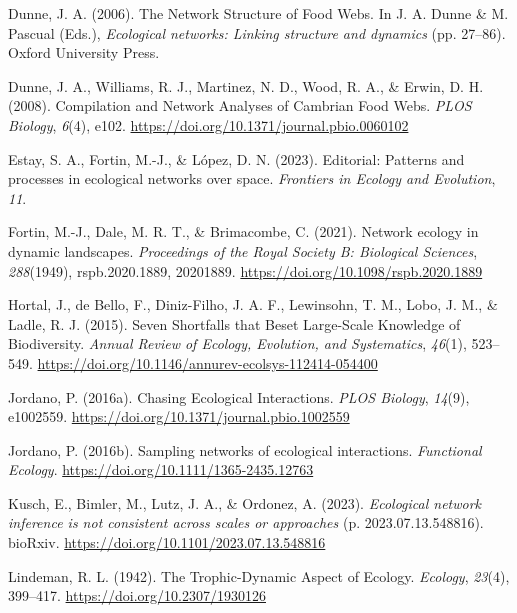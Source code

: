 \documentclass[
]{article}
\newlength{\cslhangindent}
\newenvironment{CSLReferences}[2] %
 {\begin{list}{}{%
  \setlength{\itemindent}{0pt}
  \setlength{\leftmargin}{0pt}
  \setlength{\parsep}{0pt}
  \ifodd #1
   \setlength{\leftmargin}{\cslhangindent}
   \setlength{\itemindent}{-1\cslhangindent}
  \fi
  \setlength{\itemsep}{#2\baselineskip}}}
 {\end{list}}
\begin{document}
\begin{CSLReferences}{1}{0}
Dunne, J. A. (2006). The {Network Structure} of {Food Webs}. In J. A.
Dunne \& M. Pascual (Eds.), \emph{Ecological networks: {Linking}
structure and dynamics} (pp. 27--86). Oxford University Press.

Dunne, J. A., Williams, R. J., Martinez, N. D., Wood, R. A., \& Erwin,
D. H. (2008). Compilation and {Network Analyses} of {Cambrian Food
Webs}. \emph{PLOS Biology}, \emph{6}(4), e102.
\url{https://doi.org/10.1371/journal.pbio.0060102}

Estay, S. A., Fortin, M.-J., \& López, D. N. (2023). Editorial:
{Patterns} and processes in ecological networks over space.
\emph{Frontiers in Ecology and Evolution}, \emph{11}.

Fortin, M.-J., Dale, M. R. T., \& Brimacombe, C. (2021). Network ecology
in dynamic landscapes. \emph{Proceedings of the Royal Society B:
Biological Sciences}, \emph{288}(1949), rspb.2020.1889, 20201889.
\url{https://doi.org/10.1098/rspb.2020.1889}

Hortal, J., de Bello, F., Diniz-Filho, J. A. F., Lewinsohn, T. M., Lobo,
J. M., \& Ladle, R. J. (2015). Seven {Shortfalls} that {Beset
Large-Scale Knowledge} of {Biodiversity}. \emph{Annual Review of
Ecology, Evolution, and Systematics}, \emph{46}(1), 523--549.
\url{https://doi.org/10.1146/annurev-ecolsys-112414-054400}

Jordano, P. (2016a). Chasing {Ecological Interactions}. \emph{PLOS
Biology}, \emph{14}(9), e1002559.
\url{https://doi.org/10.1371/journal.pbio.1002559}

Jordano, P. (2016b). Sampling networks of ecological interactions.
\emph{Functional Ecology}. \url{https://doi.org/10.1111/1365-2435.12763}

Kusch, E., Bimler, M., Lutz, J. A., \& Ordonez, A. (2023).
\emph{Ecological network inference is not consistent across scales or
approaches} (p. 2023.07.13.548816). bioRxiv.
\url{https://doi.org/10.1101/2023.07.13.548816}

Lindeman, R. L. (1942). The {Trophic-Dynamic Aspect} of {Ecology}.
\emph{Ecology}, \emph{23}(4), 399--417.
\url{https://doi.org/10.2307/1930126}


\end{CSLReferences}
\end{document}
